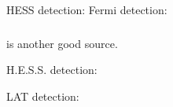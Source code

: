 
HESS detection:  \cite{aharonian_2006a_h.e.s.s.-survey}
Fermi detection: \cite{slane_2010_fermi-detection}

\subsubsection{}

 is another good source.

H.E.S.S. detection: \cite{aharonian_2008a_very-high-energy-gamma-ray}

LAT detection: \cite{rousseau_2012_fermi-lat-constraints}

\subsubsection{}



